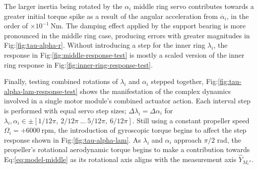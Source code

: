 \par
The larger inertia being rotated by the $\alpha_i$ middle ring servo contributes towards a greater initial torque spike as a result of the angular acceleration from $\ddot{\alpha_i}$, in the order of $\times 10^{-1}~\text{Nm}$. The damping effect applied by the support bearing is more pronounced in the middle ring case, producing errors with greater magnitudes in Fig:\ref{fig:tau-alpha-r}. Without introducing a step for the inner ring $\lambda_i$, the response in Fig:\ref{fig:middle-response-test} is mostly a scaled version of the inner ring response in Fig:\ref{fig:inner-ring-response-test}.
\par
Finally, testing combined rotations of $\lambda_i$ and $\alpha_i$ stepped together, Fig:\ref{fig:tau-alpha-lam-response-test} shows the manifestation of the complex dynamics involved in a single motor module's combined actuator action. Each interval step is performed with equal servo step sizes; $\Delta\lambda_i=\Delta\alpha_i$ for $\lambda_i,\alpha_i\in\pm[1/12\pi,~2/12\pi~\ldots~5/12\pi,~6/12\pi]$. Still using a constant propeller speed $\Omega_i=+6000~\text{rpm}$, the introduction of gyroscopic torque begins to affect the step response shown in Fig:\ref{fig:tau-alpha-lam}. As $\lambda_i$ and $\alpha_i$ approach $\pi/2$ rad, the propeller's rotational aerodynamic torque begins to make a contribution towards Eq:\ref{eq:model-middle} as its rotational axis aligns with the measurement axis $\hat{Y}_{M_i''}$.
